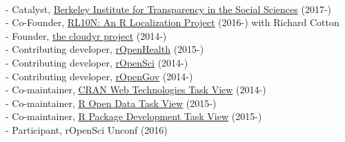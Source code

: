 \documentclass[12pt]{article}
\renewcommand{\section}[1]{\pagebreak[3]%
    \llap{\scshape\smash{\parbox[t]{\marginparwidth}{\raggedright {\color{lg}#1}}}}%
    \vspace{-\baselineskip}\par}
\newcommand{\topic}[1]{\pagebreak[3]\indent {\color{lg}{\footnotesize #1 }}\\}
\newcommand{\subentry}[1]{{\color{lg}-} #1\vspace{.25em}\\}
\begin{document}
\section{Public\\ Engagement}
	\topic{Open Science Evangelism}
		\subentry{Catalyst, \href{http://www.bitss.org/}{Berkeley Institute for Transparency in the Social Sciences} (2017-)}
		\subentry{Co-Founder, \href{http://rl10n.github.io/}{RL10N: An R Localization Project} (2016-) with Richard Cotton}
		\subentry{Founder, \href{http://cloudyr.github.io/}{the cloudyr project} (2014-)}
		\subentry{Contributing developer, \href{http://ropensci.org/}{rOpenHealth} (2015-)}
		\subentry{Contributing developer, \href{http://ropensci.org/}{rOpenSci} (2014-)}
		\subentry{Contributing developer, \href{http://ropengov.github.io/}{rOpenGov} (2014-)}
		\subentry{Co-maintainer, \href{http://cran.r-project.org/web/views/WebTechnologies.html}{CRAN Web Technologies Task View} (2014-)}
		\subentry{Co-maintainer, \href{https://www.github.com/ropensci/opendata}{R Open Data Task View} (2015-)}
		\subentry{Co-maintainer, \href{https://www.github.com/leeper/PackageDevelopment}{R Package Development Task View} (2015-)}
		\subentry{Participant, rOpenSci Unconf (2016)}
	
\end{document}
